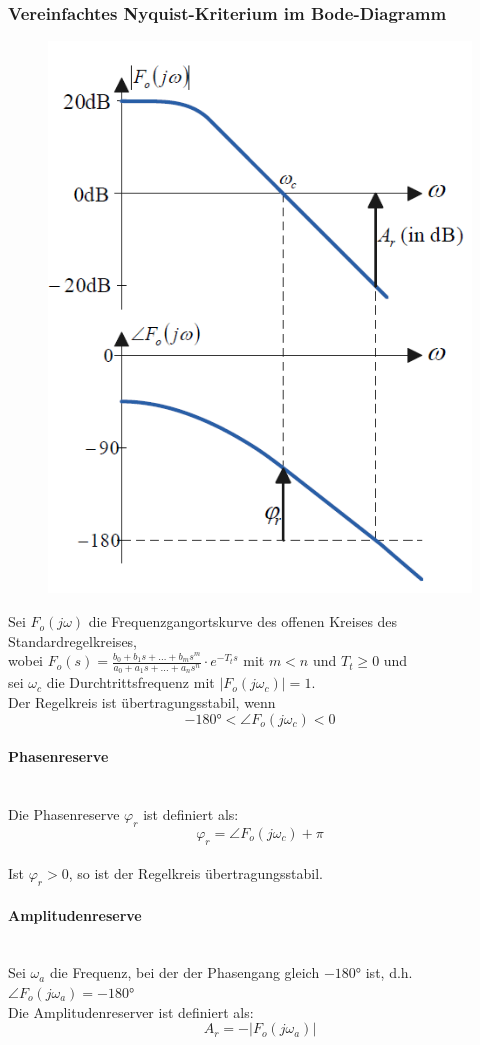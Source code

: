 \documentclass[10pt,a4paper]{article}
\begin{document}
\subsubsection{Vereinfachtes Nyquist-Kriterium im Bode-Diagramm}
\begin{figure}[H]
	\includegraphics[width = 0.4\columnwidth]{imgs/nyquist_bode.png}
\end{figure}
Sei $F_o(j \omega)$ die Frequenzgangortskurve des offenen Kreises des Standardregelkreises, \\
wobei $F_o(s) = \frac{b_0 + b_1s + \dots + b_ms^m}{a_0 + a_1s + \dots + a_ns^n} ⋅ e^{-T_ts}$ mit $m < n$ und $T_t ≥ 0$ und \\
sei $\omega_c$ die Durchtrittsfrequenz mit $|F_o(j \omega_c)| = 1$. \\
Der Regelkreis ist übertragungsstabil, wenn
$$
	-180° < \angle F_o(j \omega_c) < 0
$$

\paragraph{Phasenreserve} ~\\
Die Phasenreserve $\varphi_r$ ist definiert als:
$$
	\varphi_r = \angle F_o(j \omega_c) + \pi
$$ \\

Ist $\varphi_r > 0$, so ist der Regelkreis übertragungsstabil.

\paragraph{Amplitudenreserve} ~\\
Sei $\omega_a$ die Frequenz, bei der der Phasengang gleich $-180°$ ist, d.h. $\angle F_o(j \omega_a) = -180°$ \\
Die Amplitudenreserver ist definiert als:
$$
	A_r = -|F_o(j \omega_a)|
$$ \\
\end{document}
